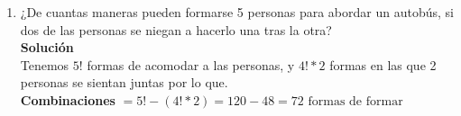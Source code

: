 \begin{enumerate}
\begin{enumerate}
\begin{proof}
            \end{proof}
            \item $\sum_{r=0}^{n} \binom{n}{r} {(a-1)}^r = a^n $
            \begin{proof}
                \begin{gather*}
                a^n ={(a+1-1)}^n = {[1+(a-1)]}^n = \sum_{r=0}^{n} \binom{n}{r} (1^{n-r}) {(a-1)}^r\\
                \end{gather*}
                \begin{gather*}
                \sum_{r=0}^{n} \binom{n}{r} {(a-1)}^r = a^n\\
                \end{gather*}
            \end{proof}
            \item $ \sum_{r=0}^{n} {\binom{n}{r}}^2 =\binom{2n}{n} $
            \begin{proof}
                \begin{gather*}
                \sum_{r=0}^{n} {\binom{n}{r}}^2 =\binom{2n}{n}\\ 
                \end{gather*}
                \begin{gather*}
                {(1+x)}^{2n} = {(1+x)}^n * {(1+x)}^n = \sum_{r=0}^{n} (\sum_{r=0}^{n} \binom{n}{j} \binom{n}{r-j} x^k)\\ 
                \end{gather*}
                \begin{gather*}
                {(1+x)}^{2n} = \sum_{k=0}^{2n} \binom{2n}{k} x^k\\ 
                \end{gather*}
                \begin{gather*}
                \binom{2n}{n} = \sum_{j=0}^{n} \binom{n}{j} \binom{n}{n-j} = \sum_{j=0}^{n} {\binom{n}{j}}^2\\ 
                \end{gather*}
            \end{proof}
        \end{enumerate}
    \item ¿De cuantas maneras pueden formarse 5 personas para abordar un autobús, si dos de las personas se niegan a hacerlo una tras la otra?
    \\\textbf{Solución}\\
    Tenemos $5!$ formas de acomodar a las personas, y $4!*2$ formas en las que 2 personas se sientan juntas por lo que.\\
    \textbf{Combinaciones} $=5!-(4!*2)=120-48= 72 \text{ formas de formar}$
    

\end{enumerate}
